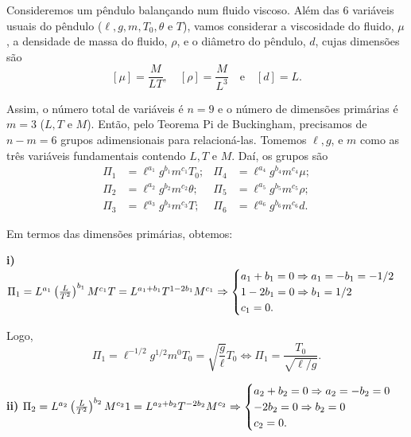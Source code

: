
%


Consideremos um pêndulo balançando num fluido viscoso. Além das 6 variáveis usuais do pêndulo ($\ell, g, m, T_0, \theta$ e $T$), vamos considerar a viscosidade do fluido, $\mu$, a densidade de massa do fluido, $\rho$, e o diâmetro do pêndulo, $d$, cujas dimensões são
$$[\mu] = \frac{M}{LT}, \quad [\rho] = \frac{M}{L^3} \quad \text{e} \quad [d] = L.$$

Assim, o número total de variáveis é $n = 9$ e o número de dimensões primárias é $m = 3$ ($L, T$ e $M$). Então, pelo Teorema Pi de Buckingham, precisamos de $n - m = 6$ grupos adimensionais para relacioná-las. Tomemos $\ell, g$, e $m$ como as três variáveis fundamentais contendo $L, T$ e $M$. Daí, os grupos são
$$
\begin{aligned}
\Pi_1 &= \ell^{a_1} g^{b_1} m^{c_1} T_0; & \Pi_4 &= \ell^{a_4} g^{b_4} m^{c_4} \mu; \\
\Pi_2 &= \ell^{a_2} g^{b_2} m^{c_2} \theta; & \Pi_5 &= \ell^{a_5} g^{b_5} m^{c_5} \rho; \\
\Pi_3 &= \ell^{a_3} g^{b_3} m^{c_3} T; & \Pi_6 &= \ell^{a_6} g^{b_6} m^{c_6} d.
\end{aligned}
$$

Em termos das dimensões primárias, obtemos:

\vspace{0.5cm}
\noindent \textbf{i)} $\Pi_1 = L^{a_1} \left(\frac{L}{T^2}\right)^{b_1} M^{c_1} T = L^{a_1+b_1} T^{1-2b_1} M^{c_1} \\ \\ \Rightarrow \begin{cases} a_1 + b_1 = 0 \Rightarrow a_1 = -b_1 = -1/2 \\ 1 - 2b_1 = 0 \Rightarrow b_1 = 1/2 \\ c_1 = 0. \end{cases}$

Logo,
$$\Pi_1 = \ell^{-1/2} g^{1/2} m^0 T_0 = \sqrt{\frac{g}{\ell}} T_0 \Leftrightarrow \Pi_1 = \frac{T_0}{\sqrt{\ell/g}}.$$

\vspace{0.5cm}
\noindent \textbf{ii)} $\Pi_2 = L^{a_2} \left(\frac{L}{T^2}\right)^{b_2} M^{c_2} 1 = L^{a_2+b_2} T^{-2b_2} M^{c_2} \\ \\ \Rightarrow \begin{cases} a_2 + b_2 = 0 \Rightarrow a_2 = -b_2 = 0 \\ -2b_2 = 0 \Rightarrow b_2 = 0 \\ c_2 = 0. \end{cases}$

